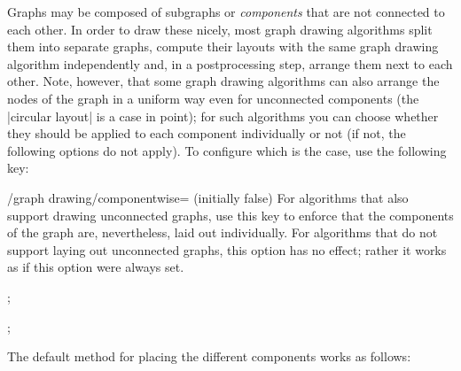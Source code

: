 \label{subsection-gd-component-packing}

Graphs may be composed of subgraphs or \emph{components} that are not
connected to each other. In order to draw these nicely, most graph
drawing algorithms split them into separate graphs, compute
their layouts with the same graph drawing algorithm independently and,
in a postprocessing step, arrange them next to each other. Note,
however, that some graph drawing algorithms can also arrange the nodes
of the graph in a uniform way even for unconnected components (the
|circular layout| is a case in point); for such algorithms you can
choose whether they should be applied to each component individually
or not (if not, the following options do not apply). To configure
which is the case, use the following key:

\begin{key}{/graph drawing/componentwise= (initially
    false)}
  For algorithms that also support drawing unconnected graphs, use
  this key to enforce that the components of the graph are,
  nevertheless, laid out individually. For algorithms that do not
  support laying out unconnected graphs, this option has no effect;
  rather it works as if this option were always set.
\begin{codeexample}[]
\tikz {};    
\end{codeexample}
\begin{codeexample}[]
\tikz {};    
\end{codeexample}
\end{key}

The default method for placing the different components works as
follows:

